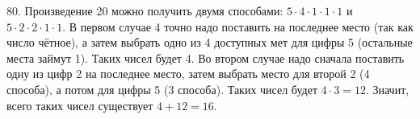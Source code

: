 80. Произведение 20 можно получить двумя способами: $5\cdot4\cdot1\cdot1\cdot1$ и $5\cdot2\cdot2\cdot1\cdot1.$ В первом случае 4 точно надо поставить на последнее место (так как число чётное), а затем выбрать одно из 4 доступных мет для цифры 5 (остальные места займут 1). Таких чисел будет 4. Во втором случае надо сначала поставить одну из цифр 2 на последнее место, затем выбрать место для второй 2 (4 способа), а потом для цифры 5 (3 способа). Таких чисел будет $4\cdot3=12.$ Значит, всего таких чисел существует $4+12=16.$\\
